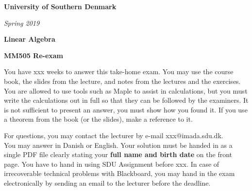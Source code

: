 \documentclass[a4paper,12pt,fleqn]{article}
\newcommand{\institution}{University of Southern Denmark}
\newcommand{\titlehd}{Linear Algebra}
\newcommand{\examdate}{Spring 2019}
\newcommand{\examcode}{MM505 Re-exam}
\begin{document}

\begin{center}
\large\textbf{\institution}
\end{center}
\vspace{1cm}

\begin{center}
\textit{ \examdate}
\end{center}
\vspace{1cm}

\begin{center}
\large\textbf{\titlehd}
\end{center}

\begin{center}
\large\textbf{\examcode}
\end{center}
\vspace{4cm}


\begin{center}
You have xxx weeks to answer this take-home exam. You may use
the course book, the slides from the lecture, and notes from the
lectures and the exercises. You are allowed to use tools such as Maple to
assist in calculations, but you must write the calculations out in full so
that they can be followed by the examiners. 
It is not sufficient to present an answer, you must show how you found it.
If you use a theorem from the book (or the slides), make a reference to it. \newline
\vspace{5mm}

For questions, you may contact the lecturer by e-mail
xxx@imada.sdu.dk. \\
You may answer in Danish or English. Your solution must be handed in as
a single PDF file clearly stating your {\bf full name and birth date} on the front
page. You have to hand in using SDU Assignment before xxx.
In case of irrecoverable technical problems with Blackboard, you may
hand in the exam electronically by sending an email to the lecturer before the deadline. \\
\end{center}




\newpage
\end{document}
